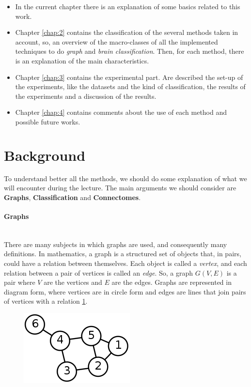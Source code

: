 \begin{itemize}
	\item In the current chapter there is an explanation of some basics related to this work.
	\item Chapter \ref{chap:2} contains the classification of the several methods taken in account, so, an overview of the macro-classes of all the implemented techniques to do \emph{graph} and \emph{brain classification}. 
	Then, for each method, there is an explanation of the main characteristics.
	\item Chapter \ref{chap:3} contains the experimental part. Are described the set-up of the experiments, like the datasets and the kind of classification, the results of the experiments and a discussion of the results.
	\item Chapter \ref{chap:4} contains comments about the use of each method and possible future works. 
\end{itemize}

\section{Background}
To understand better all the methods, we should do some explanation of what we will encounter during the lecture. The main arguments we should consider are \textbf{Graphs}, \textbf{Classification} and \textbf{Connectomes}.

\paragraph{Graphs} \
\\
There are many subjects in which graphs are used, and consequently many definitions. In mathematics, a graph is a structured set of objects that, in pairs, could have a relation between themselves. Each object is called a \textit{vertex}, and each relation between a pair of vertices is called an \textit{edge}. So, a graph $ G(V,E) $ is a pair where $ V $ are the vertices and $ E $ are the edges. Graphs are represented in diagram form, where vertices are in circle form and edges are lines that join pairs of vertices with a relation \ref{fig:diagram}.
\begin{figure}[htbp]
	\centering
	\includegraphics[scale=0.5]{Immagini/220px-6n-graf.svg.png}
	\caption{\label{fig:diagram}}
\end{figure}

